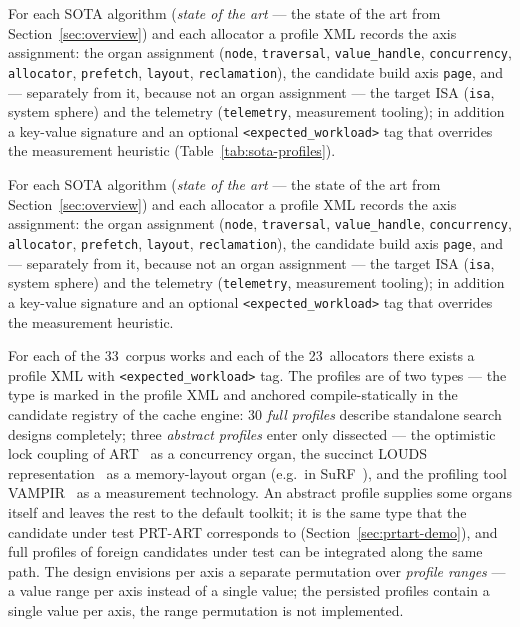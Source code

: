 \begin{nurlang}
For each SOTA algorithm (\emph{state of the art} --- the state of the art from
Section~\ref{sec:overview}) and each allocator a profile XML records the axis assignment: the
organ assignment (\texttt{node}, \texttt{traversal}, \texttt{value\_handle}, \texttt{concurrency},
\texttt{allocator}, \texttt{prefetch}, \texttt{layout}, \texttt{reclamation}), the candidate build axis
\texttt{page}, and --- separately from it, because not an organ assignment --- the target ISA (\texttt{isa},
system sphere) and the telemetry (\texttt{telemetry}, measurement tooling); in addition a key-value signature
and an optional \texttt{<expected\_workload>} tag that overrides the measurement heuristic
(Table~\ref{tab:sota-profiles}).
\end{nurlang}
\begin{nurkurz}
For each SOTA algorithm (\emph{state of the art} --- the state of the art from
Section~\ref{sec:overview}) and each allocator a profile XML records the axis assignment: the
organ assignment (\texttt{node}, \texttt{traversal}, \texttt{value\_handle}, \texttt{concurrency},
\texttt{allocator}, \texttt{prefetch}, \texttt{layout}, \texttt{reclamation}), the candidate build axis
\texttt{page}, and --- separately from it, because not an organ assignment --- the target ISA (\texttt{isa},
system sphere) and the telemetry (\texttt{telemetry}, measurement tooling); in addition a key-value signature
and an optional \texttt{<expected\_workload>} tag that overrides the measurement heuristic.
\end{nurkurz}

For each of the 33~corpus works and each of the 23~allocators there exists a profile XML
with \texttt{<expected\_workload>} tag. The profiles are of two types --- the type is marked in the
profile XML and anchored compile-statically in the candidate registry of the cache engine: 30
\emph{full profiles} describe standalone search designs completely; three \emph{abstract profiles}
enter only dissected --- the optimistic lock coupling of ART~\cite{leis2016olc} as a
concurrency organ, the succinct LOUDS representation~\cite{jacobson1989louds} as a
memory-layout organ (e.g.\ in SuRF~\cite{zhang2018surf}), and the profiling tool
VAMPIR~\cite{berthold2023vampir} as a measurement technology. An abstract profile supplies some organs itself
and leaves the rest to the default toolkit; it is the same type that the candidate under test PRT-ART
corresponds to (Section~\ref{sec:prtart-demo}), and full profiles of foreign candidates under test can be integrated
along the same path. The design envisions per axis a separate permutation over
\emph{profile ranges} --- a value range per axis instead of a single value; the persisted
profiles contain a single value per axis, the range permutation is not implemented.

